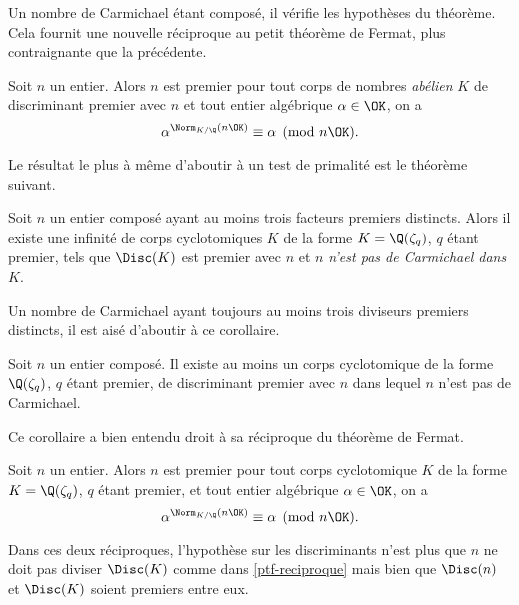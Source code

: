 Un nombre de Carmichael étant composé, il vérifie les hypothèses du théorème. Cela fournit une nouvelle réciproque au petit théorème de Fermat, plus contraignante que la précédente.

\begin{theoreme}
	Soit $n$ un entier. Alors $n$ est premier \ssi pour tout corps de nombres \emph{abélien} $K$ de discriminant premier avec $n$ et tout entier algébrique $\alpha \in \OK$, on a $$\alpha^{\Norm_{K/\Q}(n\OK)} \equiv \alpha \pmod{n\OK}.$$
\end{theoreme}

Le résultat le plus à même d'aboutir à un test de primalité est le théorème suivant.

\begin{theoreme}\label{theoreme-3.6}
	Soit $n$ un entier composé ayant au moins trois facteurs premiers distincts. Alors il existe une infinité de corps cyclotomiques $K$ de la forme $K = \Q(\zeta_q)$, $q$ étant premier, tels que $\Disc(K)$ est premier avec $n$ et $n$ \emph{n'est pas de Carmichael dans $K$}.
\end{theoreme}

Un nombre de Carmichael ayant toujours au moins trois diviseurs premiers distincts, il est aisé d'aboutir à ce corollaire.

\begin{corollaire}\label{corollaire-3.7}
	Soit $n$ un entier composé. Il existe au moins un corps cyclotomique de la forme $\Q(\zeta_q)$, $q$ étant premier, de discriminant premier avec $n$ dans lequel $n$ n'est pas de Carmichael.
\end{corollaire}

Ce corollaire a bien entendu droit à sa réciproque du théorème de Fermat.

\begin{theoreme}
	Soit $n$ un entier. Alors $n$ est premier \ssi pour tout corps cyclotomique $K$ de la forme $K = \Q(\zeta_q)$, $q$ étant premier, et tout entier algébrique $\alpha\in \OK$, on a $$\alpha^{\Norm_{K/\Q}(n\OK)} \equiv \alpha \pmod{n\OK}.$$
\end{theoreme}

\begin{remarque}
	Dans ces deux réciproques, l'hypothèse sur les discriminants n'est plus que $n$ ne doit pas diviser $\Disc(K)$ comme dans \ref{ptf-reciproque} mais bien que $\Disc(n)$ et $\Disc(K)$ soient premiers entre eux.
\end{remarque}

